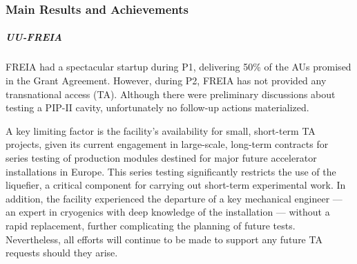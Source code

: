 
\subsubsection*{Main Results and Achievements}


\subparagraph{UU-FREIA}

FREIA had a spectacular startup during P1, delivering 50\% of the AUs promised in the Grant Agreement. However, during P2, FREIA has not provided any transnational access (TA). Although there were preliminary discussions about testing a PIP-II cavity, unfortunately no follow-up actions materialized.

A key limiting factor is the facility’s availability for small, short-term TA projects, given its current engagement in large-scale, long-term contracts for series testing of production modules destined for major future accelerator installations in Europe. This series testing significantly restricts the use of the liquefier, a critical component for carrying out short-term experimental work. In addition, the facility experienced the departure of a key mechanical engineer — an expert in cryogenics with deep knowledge of the installation — without a rapid replacement, further complicating the planning of future tests.
Nevertheless, all efforts will continue to be made to support any future TA requests should they arise.



 


